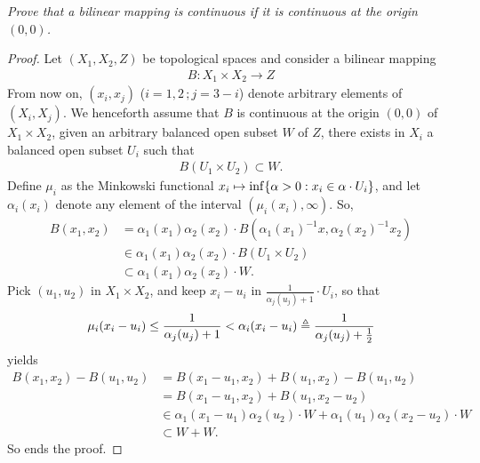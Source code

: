 \textit{%
Prove that a bilinear mapping is continuous %
if it is continuous at the origin $(0, 0)$.
}
\begin{proof}
Let $(X_1, X_2, Z)$ be topological spaces %
and consider a bilinear mapping %
%
  \begin{align}
    B: X_1 \times X_2 \to Z 
  \end{align}
%
From now on, $(x_i, x_j)$ ($i=1, 2\,; j=3-i$) denote arbitrary elements of %
%
  $(X_i, X_j)$. %
%
We henceforth assume that $B$ is continuous at the origin %
%
  $(0, 0)$ of $X_1\times X_2$, \ie  %
%
given an arbitrary balanced open subset $W$ of $Z$, %
there exists in $X_i$ a balanced open subset $U_i$ such that %
%
  \begin{align}
    B(U_1 \times U_2) \subset W .
  \end{align}
%
Define $\mu_i$ as the Minkowski functional %
%
  $x_i \mapsto \inf\{\alpha > 0: x_i \in \alpha \cdot U_i\}$, %
%
and let $\alpha_i(x_i)$ denote any element of the interval %
%
  $(\mu_i(x_i), \infty)$. %
%
So, 
%
  \begin{align}
    B(x_1, x_2) 
      & = 
        \alpha_1(x_1)\alpha_2(x_2) 
            \cdot 
        B\left(
          \alpha_1(x_1)^{\minus 1}x , 
          \alpha_2(x_2)^{\minus 1} x_2
        \right) \\
      & \in 
    \alpha_1(x_1) \alpha_2(x_2) \cdot B(U_1 \times U_2) \\
      & \subset 
    \alpha_1(x_1) \alpha_2(x_2) \cdot W.
  \end{align}
Pick $(u_1, u_2)$ in $X_1\times X_2$, and keep $x_i -u_i$ in %
%
  $\displaystyle{\frac{1}{\alpha_j(u_j)+1} \cdot U_i}$, %
%
so that
%
  \begin{align}
    \mu_i(x_i-u_i) 
      \leq 
    \frac{1}{\alpha_j(u_j) + 1} 
      < 
    \alpha_i(x_i-u_i) \triangleq \frac{1}{\alpha_j(u_j) + \frac{1}{2}} 
  \end{align}
%
%
yields %
\begin{align}
  B(x_1, x_2) - B(u_1, u_2) 
    & = B(x_1-u_1, x_2) + B(u_1, x_2) - B(u_1,u_2) \\
    & = B(x_1-u_1, x_2) + B(u_1, x_2-u_2) \\
    & \in \alpha_1(x_1-u_1)\alpha_2(u_2)\cdot W + \alpha_1(u_1)\alpha_2(x_2-u_2) \cdot W \\
    & \subset W + W .
\end{align}
%
So ends the proof.
\end{proof}
%
